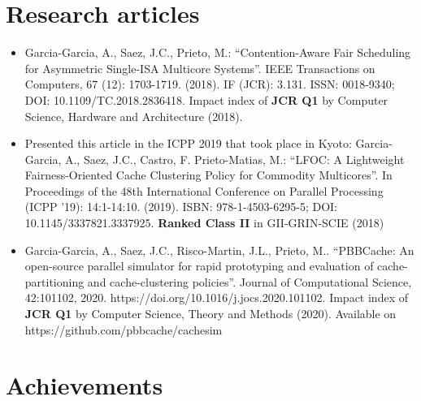 \documentclass[10pt,a4paper,sans]{moderncv}        %
\begin{document}
\section{Research articles}
\begin{itemize}
\item Garcia-Garcia, A., Saez, J.C., Prieto, M.: “Contention-Aware Fair Scheduling for Asymmetric Single-ISA Multicore Systems”. IEEE Transactions on Computers, 67 (12): 1703-1719. (2018). IF (JCR): 3.131. ISSN: 0018-9340; DOI: 10.1109/TC.2018.2836418. Impact index of \textbf{JCR Q1} by Computer Science, Hardware and Architecture (2018).
\smallskip
\item Presented this article in the ICPP 2019 that took place in Kyoto: Garcia-Garcia, A., Saez, J.C., Castro, F. Prieto-Matias, M.: “LFOC: A Lightweight Fairness-Oriented Cache Clustering Policy for Commodity Multicores”. In Proceedings of the 48th International Conference on Parallel Processing (ICPP '19): 14:1-14:10. (2019).  ISBN: 978-1-4503-6295-5; DOI: 10.1145/3337821.3337925. \textbf{Ranked Class II} in GII-GRIN-SCIE (2018)
\smallskip
\item Garcia-Garcia, A., Saez, J.C., Risco-Martin, J.L., Prieto, M.. “PBBCache: An open-source parallel simulator for rapid prototyping and evaluation of cache-partitioning and cache-clustering policies”. Journal of Computational Science, 42:101102, 2020. https://doi.org/10.1016/j.jocs.2020.101102. Impact index of \textbf{JCR Q1} by Computer Science, Theory and Methods (2020). Available on https://github.com/pbbcache/cachesim
\end{itemize}


\section{Achievements}
\end{document}
